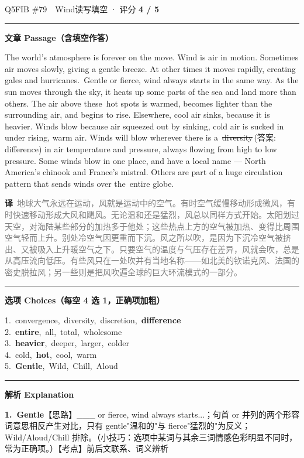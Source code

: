 \documentclass[11pt]{article}
\newcommand{\ptesub}[1]{%
  \par\needspace{2\baselineskip}\smallskip
  {\color{cAccent}\rule[-0.2ex]{3pt}{1.05em}}\hspace{6pt}%
  {\bfseries\color{cHead}#1}\par\nopagebreak\smallskip}
\newcommand{\zh}[1]{{\footnotesize\textcolor{cNote}{\textbf{译}}\ \textcolor{gray}{#1}}}
\newcommand{\rok}[1]{{\color{cFix}\ding{51}\,#1}}                 %
\newcommand{\rno}[2]{{\color{cWrong}\ding{55}\,\sout{#1}}\,{\footnotesize\color{cFix}(答案:\,#2)}}  %
\begin{document}
\begin{qblock}{Q5\quad FIB \#79\ \ Wind}{读写填空 · 评分 \textcolor{cAccent}{\bfseries 4 / 5}}
\ptesub{文章 Passage（含填空作答）}
\begin{promptbox}
The world's atmosphere is forever on the move. Wind is air in motion. Sometimes air moves slowly, giving a gentle breeze. At other times it moves rapidly, creating gales and hurricanes. \rok{Gentle} or fierce, wind always starts in the same way. As the sun moves through the sky, it heats up some parts of the sea and land more than others. The air above these \rok{hot} spots is warmed, becomes lighter than the surrounding air, and begins to rise. Elsewhere, cool air sinks, because it is \rok{heavier}. Winds blow because air squeezed out by sinking, cold air is sucked in under rising, warm air. Winds will blow wherever there is a \rno{diversity}{difference} in air temperature and pressure, always flowing from high to low pressure. Some winds blow in one place, and have a local name --- North America's chinook and France's mistral. Others are part of a huge circulation pattern that sends winds over the \rok{entire} globe.
\end{promptbox}
\zh{地球大气永远在运动，风就是运动中的空气。有时空气缓慢移动形成微风，有时快速移动形成大风和飓风。无论温和还是猛烈，风总以同样方式开始。太阳划过天空，对海陆某些部分的加热多于他处；这些热点上方的空气被加热、变得比周围空气轻而上升。别处冷空气因更重而下沉。风之所以吹，是因为下沉冷空气被挤出、又被吸入上升暖空气之下。只要空气的温度与气压存在差异，风就会吹，总是从高压流向低压。有些风只在一处吹并有当地名称——如北美的钦诺克风、法国的密史脱拉风；另一些则是把风吹遍全球的巨大环流模式的一部分。}
\ptesub{选项 Choices（每空 4 选 1，正确项加粗）}
{\small
1.\ convergence,\ diversity,\ discretion,\ \textbf{difference}\\
2.\ \textbf{entire},\ all,\ total,\ wholesome\\
3.\ \textbf{heavier},\ deeper,\ larger,\ colder\\
4.\ cold,\ \textbf{hot},\ cool,\ warm\\
5.\ \textbf{Gentle},\ Wild,\ Chill,\ Aloud}
\ptesub{解析 Explanation}
\begin{notebox}\footnotesize
\textbf{1.\ Gentle}\quad【思路】\_\_\_ or fierce, wind always starts...；句首 or 并列的两个形容词意思相反产生对比，只有 gentle"温和的"与 fierce"猛烈的"为反义；Wild/Aloud/Chill 排除。（小技巧：选项中某词与其余三词情感色彩明显不同时，常为正确项。）【考点】前后文联系、词义辨析\par\smallskip

\end{notebox}
\end{qblock}
\end{document}
